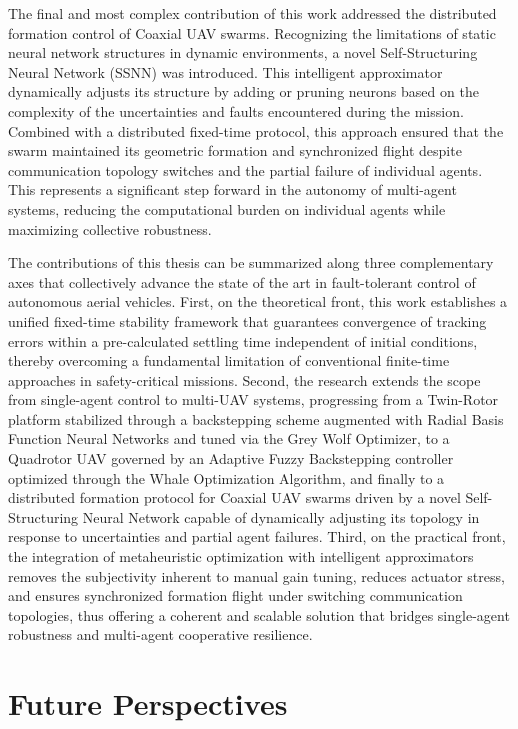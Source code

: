 The final and most complex contribution of this work addressed the distributed formation control of Coaxial UAV swarms. Recognizing the limitations of static neural network structures in dynamic environments, a novel Self-Structuring Neural Network (SSNN) was introduced. This intelligent approximator dynamically adjusts its structure by adding or pruning neurons based on the complexity of the uncertainties and faults encountered during the mission. Combined with a distributed fixed-time protocol, this approach ensured that the swarm maintained its geometric formation and synchronized flight despite communication topology switches and the partial failure of individual agents. This represents a significant step forward in the autonomy of multi-agent systems, reducing the computational burden on individual agents while maximizing collective robustness.

The contributions of this thesis can be summarized along three complementary axes that collectively advance the state of the art in fault-tolerant control of autonomous aerial vehicles. First, on the theoretical front, this work establishes a unified fixed-time stability framework that guarantees convergence of tracking errors within a pre-calculated settling time independent of initial conditions, thereby overcoming a fundamental limitation of conventional finite-time approaches in safety-critical missions. Second, the research extends the scope from single-agent control to multi-UAV systems, progressing from a Twin-Rotor platform stabilized through a backstepping scheme augmented with Radial Basis Function Neural Networks and tuned via the Grey Wolf Optimizer, to a Quadrotor UAV governed by an Adaptive Fuzzy Backstepping controller optimized through the Whale Optimization Algorithm, and finally to a distributed formation protocol for Coaxial UAV swarms driven by a novel Self-Structuring Neural Network capable of dynamically adjusting its topology in response to uncertainties and partial agent failures. Third, on the practical front, the integration of metaheuristic optimization with intelligent approximators removes the subjectivity inherent to manual gain tuning, reduces actuator stress, and ensures synchronized formation flight under switching communication topologies, thus offering a coherent and scalable solution that bridges single-agent robustness and multi-agent cooperative resilience.

\section*{Future Perspectives}

